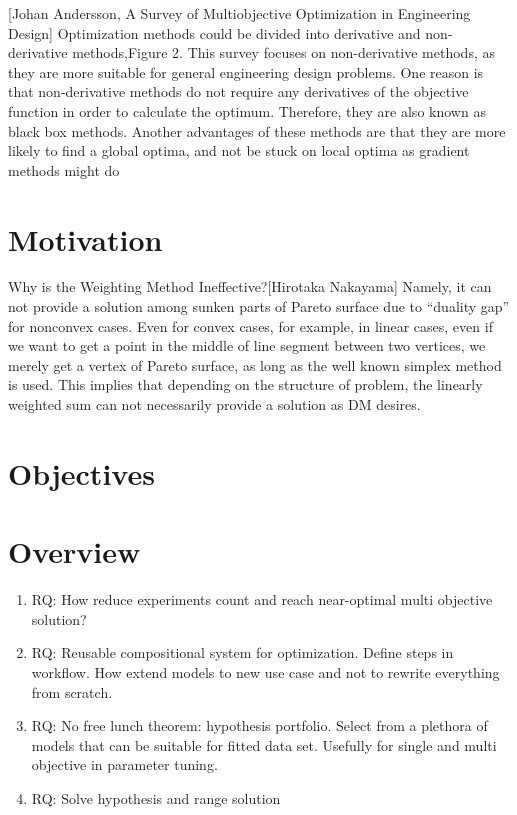 \documentclass[ms,english]{stthesis}
\begin{document}
        [Johan Andersson, A Survey of Multiobjective Optimization in Engineering Design] 
        Optimization methods could be divided into derivative and non-derivative methods,Figure 2. This survey focuses on non-derivative methods, as they are more suitable for
        general engineering design problems. One reason is that non-derivative methods do not
        require any derivatives of the objective function in order to calculate the optimum.
        Therefore, they are also known as black box methods. Another advantages of these
        methods are that they are more likely to find a global optima, and not be stuck on local
        optima as gradient methods might do

        \section{Motivation}
        Why is the Weighting Method Ineffective?[Hirotaka Nakayama]
        Namely, it can not provide a solution among sunken parts of Pareto surface due to “duality gap” for nonconvex cases. 
        Even for convex cases, for example, in linear cases, even if we want to get a point in the middle of line segment between two vertices, we merely get a vertex of Pareto surface, as
        long as the well known simplex method is used. This implies that depending on the structure of problem, the linearly weighted sum can not necessarily provide a solution as DM desires.

      
        \section{Objectives}
        \lipsum
  	
        \section{Overview}
            \begin{enumerate}
                \item RQ: How reduce experiments count and reach near-optimal multi objective solution?
                \item RQ: Reusable compositional system for optimization. Define steps in workflow. How extend models to new use case and not to rewrite everything from scratch.
                \item RQ: No free lunch theorem: hypothesis portfolio. Select from a plethora of models that can be suitable for fitted data set. Usefully for single and multi objective in parameter tuning.
                \item RQ: Solve hypothesis and range solution
            \end{enumerate}
\end{document}
